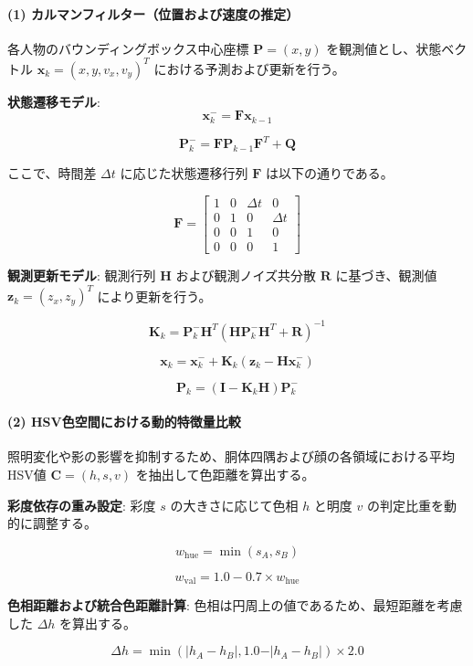 \paragraph{(1) カルマンフィルター（位置および速度の推定）}
各人物のバウンディングボックス中心座標 $\mathbf{P} = (x, y)$ を観測値とし、状態ベクトル $\mathbf{x}_k = (x, y, v_x, v_y)^T$ における予測および更新を行う。

\textbf{状態遷移モデル}:
$$\mathbf{x}_k^- = \mathbf{F} \mathbf{x}_{k-1}$$

$$\mathbf{P}_k^- = \mathbf{F} \mathbf{P}_{k-1} \mathbf{F}^T + \mathbf{Q}$$

ここで、時間差 $\Delta t$ に応じた状態遷移行列 $\mathbf{F}$ は以下の通りである。

$$\mathbf{F} = \begin{bmatrix} 
1 & 0 & \Delta t & 0 \\
0 & 1 & 0 & \Delta t \\
0 & 0 & 1 & 0 \\
0 & 0 & 0 & 1 
\end{bmatrix}$$

\textbf{観測更新モデル}:
観測行列 $\mathbf{H}$ および観測ノイズ共分散 $\mathbf{R}$ に基づき、観測値 $\mathbf{z}_k = (z_x, z_y)^T$ により更新を行う。

$$\mathbf{K}_k = \mathbf{P}_k^- \mathbf{H}^T (\mathbf{H} \mathbf{P}_k^- \mathbf{H}^T + \mathbf{R})^{-1}$$

$$\mathbf{x}_k = \mathbf{x}_k^- + \mathbf{K}_k (\mathbf{z}_k - \mathbf{H} \mathbf{x}_k^-)$$

$$\mathbf{P}_k = (\mathbf{I} - \mathbf{K}_k \mathbf{H}) \mathbf{P}_k^-$$

\paragraph{(2) HSV色空間における動的特徴量比較}
照明変化や影の影響を抑制するため、胴体四隅および顔の各領域における平均HSV値 $\mathbf{C} = (h, s, v)$ を抽出して色距離を算出する。

\textbf{彩度依存の重み設定}:
彩度 $s$ の大きさに応じて色相 $h$ と明度 $v$ の判定比重を動的に調整する。

$$w_{\text{hue}} = \min(s_A, s_B)$$

$$w_{\text{val}} = 1.0 - 0.7 \times w_{\text{hue}}$$

\textbf{色相距離および統合色距離計算}:
色相は円周上の値であるため、最短距離を考慮した $\Delta h$ を算出する。

$$\Delta h = \min(\vert{}h_A - h_B\vert{}, 1.0 - \vert{}h_A - h_B\vert{}) \times 2.0$$

